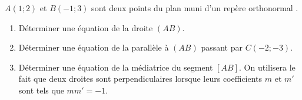 
$A(1;2)$ et $B(-1;3)$ sont deux points du plan muni d'un repère orthonormal \Oij. 
\begin{enumerate}
\item Déterminer une équation de la droite $(AB)$.
\item Déterminer une équation de la parallèle à $(AB)$ passant par $C(-2;-3)$.
\item Déterminer une équation de la médiatrice du segment $[AB]$. On utilisera le fait que deux droites sont perpendiculaires lorsque leurs coefficients $m$ et $m'$ sont tels que $mm'=-1.$\end{enumerate}